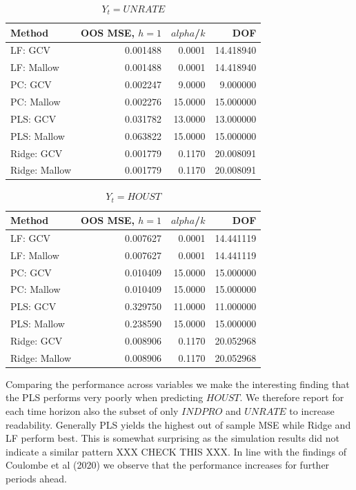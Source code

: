 \begin{table}[h!]
\centering
\caption{$Y_t = UNRATE$}
\label{tab::unrate}
\begin{tabular}{lrrr}
\toprule
       Method &  OOS MSE, $h =1$ &  $alpha$/$k$ &  DOF \\
\midrule
      LF: GCV & 0.001488 &   0.0001 & 14.418940 \\
   LF: Mallow & 0.001488 &   0.0001 & 14.418940 \\
      PC: GCV & 0.002247 &   9.0000 &  9.000000 \\
   PC: Mallow & 0.002276 &  15.0000 & 15.000000 \\
     PLS: GCV & 0.031782 &  13.0000 & 13.000000 \\
  PLS: Mallow & 0.063822 &  15.0000 & 15.000000 \\
   Ridge: GCV & 0.001779 &   0.1170 & 20.008091 \\
Ridge: Mallow & 0.001779 &   0.1170 & 20.008091 \\
\bottomrule
\end{tabular}
\end{table}

\begin{table}[h!]
\centering
\caption{$Y_t = HOUST$}
\label{tab::houst}
\begin{tabular}{lrrr}
\toprule
       Method &  OOS MSE, $h =1$ &  $alpha$/$k$ &  DOF \\
\midrule
      LF: GCV & 0.007627 &   0.0001 & 14.441119 \\
   LF: Mallow & 0.007627 &   0.0001 & 14.441119 \\
      PC: GCV & 0.010409 &  15.0000 & 15.000000 \\
   PC: Mallow & 0.010409 &  15.0000 & 15.000000 \\
     PLS: GCV & 0.329750 &  11.0000 & 11.000000 \\
  PLS: Mallow & 0.238590 &  15.0000 & 15.000000 \\
   Ridge: GCV & 0.008906 &   0.1170 & 20.052968 \\
Ridge: Mallow & 0.008906 &   0.1170 & 20.052968 \\
\bottomrule
\end{tabular}
\end{table}

Comparing the performance across variables we make the interesting finding that the PLS performs very poorly when predicting $HOUST$. We therefore report for each time horizon also the subset of only $INDPRO$ and $UNRATE$ to increase readability. Generally PLS yields the highest out of sample MSE while Ridge and LF perform best. This is somewhat surprising as the simulation results did not indicate a similar pattern XXX CHECK THIS XXX. 
In line with the findings of Coulombe et al (2020) we observe that the performance increases for further periods ahead.



